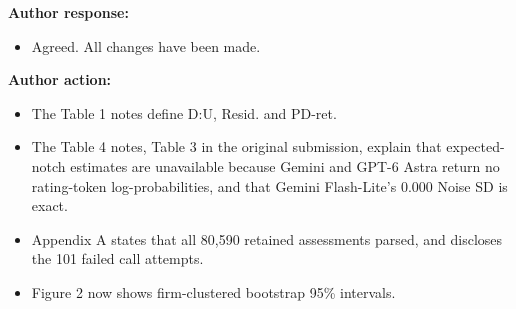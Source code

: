 \documentclass[11pt]{article}
\begin{document}
\textbf{Author response:}

\begin{itemize}

\item Agreed. All changes have been made.

\end{itemize}

\textbf{Author action:}

\begin{itemize}

\item The Table 1 notes define D:U, Resid. and PD-ret.

\item The Table 4 notes, Table 3 in the original submission, explain that expected-notch estimates are unavailable because Gemini and GPT-6 Astra return no rating-token log-probabilities, and that Gemini Flash-Lite's 0.000 Noise SD is exact.

\item Appendix A states that all 80,590 retained assessments parsed, and discloses the 101 failed call attempts.

\item Figure 2 now shows firm-clustered bootstrap 95\% intervals.

\end{itemize}
\end{document}
